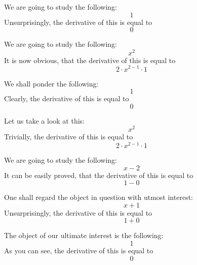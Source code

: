 \documentclass{article}
\begin{document}
We are going to study the following:
\begin{equation}
1 
\end{equation}
Unsurprisingly, the derivative of this is equal to
\begin{equation}
0 
\end{equation}

We are going to study the following:
\begin{equation}
x ^{2 } 
\end{equation}
It is now obvious, that the derivative of this is equal to
\begin{equation}
2 \cdot x ^{2 - 1 } \cdot 1 
\end{equation}

We shall ponder the following:
\begin{equation}
1 
\end{equation}
Clearly, the derivative of this is equal to
\begin{equation}
0 
\end{equation}

Let us take a look at this:
\begin{equation}
x ^{2 } 
\end{equation}
Trivially, the derivative of this is equal to
\begin{equation}
2 \cdot x ^{2 - 1 } \cdot 1 
\end{equation}

We are going to study the following:
\begin{equation}
x - 2 
\end{equation}
It can be easily proved, that the derivative of this is equal to
\begin{equation}
1 - 0 
\end{equation}

One shall regard the object in question with utmost interest:
\begin{equation}
x + 1 
\end{equation}
Unsurprisingly, the derivative of this is equal to
\begin{equation}
1 + 0 
\end{equation}

The object of our ultimate interest is the following:
\begin{equation}
1 
\end{equation}
As you can see, the derivative of this is equal to
\begin{equation}
0 
\end{equation}
\end{document}

